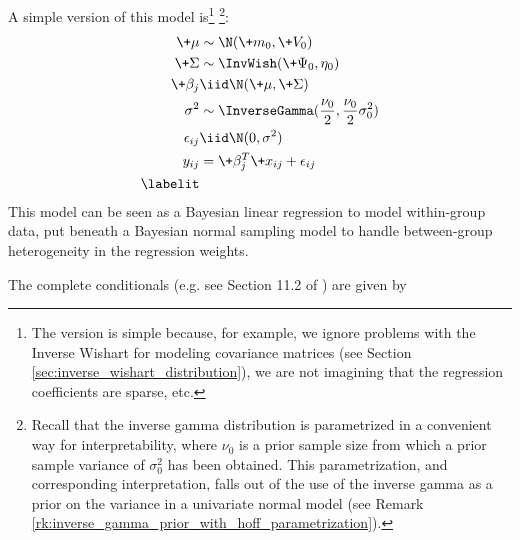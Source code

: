 \documentclass{article} %
\begin{document}
A simple version of this model is\footnote{The version is simple because,  for example,   we ignore problems with the Inverse Wishart for modeling covariance matrices (see Section \ref{sec:inverse_wishart_distribution}),  we are not imagining that the regression coefficients are sparse,  etc.} \footnote{Recall that the inverse gamma distribution is parametrized in a convenient way for interpretability,  where $\nu_0$ is a prior sample size from which a  prior sample variance of $\sigma_0^2$ has been obtained.  This parametrization,  and corresponding interpretation,  falls out of the use of the inverse gamma as a prior on the variance in a univariate normal model (see Remark \ref{rk:inverse_gamma_prior_with_hoff_parametrization}). }:
\begin{align*}
\+\mu &\sim  \N (\+m_0,\+V_0) \\
\+\Sigma &\sim \InvWish(\+\Psi_0,  \eta_0) \\
\+\beta_j &\iid \N(\+\mu,  \+\Sigma) \\
\sigma^2 &\sim \InverseGamma (\frac{\nu_0}{2}, \frac{\nu_0}{2} \sigma_0^2) \\
\epsilon_{ij} &\iid \N(0, \sigma^2) \\
y_{ij} &= \+\beta_j^T \+x_{ij} + \epsilon_{ij} \\
\labelit \label{eqn:hierarchical_linear_regression}
\end{align*}
This model can be seen as a Bayesian linear regression to model within-group data,  put beneath a Bayesian normal sampling model to handle between-group heterogeneity in the regression weights. 
 
The complete conditionals (e.g.  see Section 11.2 of \cite{hoff2009first}) are given by
\end{document}
